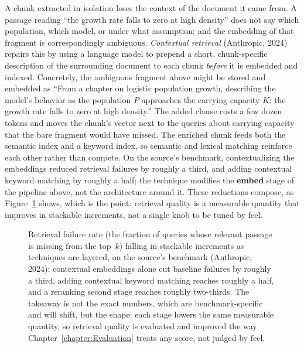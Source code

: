 A chunk extracted in isolation loses the context of the document it came from.
A passage reading ``the growth rate falls to zero at high density'' does not say which population, which model, or under what assumption; and the embedding of that fragment is correspondingly ambiguous.
\emph{Contextual retrieval} (Anthropic, 2024) repairs this by using a language model to prepend a short, chunk-specific description of the surrounding document to each chunk \emph{before} it is embedded and indexed.
Concretely, the ambiguous fragment above might be stored and embedded as ``From a chapter on logistic population growth, describing the model's behavior as the population $P$ approaches the carrying capacity $K$: the growth rate falls to zero at high density.''
The added clause costs a few dozen tokens and moves the chunk's vector next to the queries about carrying capacity that the bare fragment would have missed.
The enriched chunk feeds both the semantic index and a keyword index, so semantic and lexical matching reinforce each other rather than compete.
On the source's benchmark, contextualizing the embeddings reduced retrieval failures by roughly a third, and adding contextual keyword matching by roughly a half; the technique modifies the \textbf{embed} stage of the pipeline above, not the architecture around it.
These reductions compose, as Figure~\ref{figure:RetrievalStaircase} shows, which is the point: retrieval quality is a measurable quantity that improves in stackable increments, not a single knob to be tuned by feel.

\begin{figure}[htb!]
\begin{center}

\caption{Retrieval failure rate (the fraction of queries whose relevant passage is missing from the top~$k$) falling in stackable increments as techniques are layered, on the source's benchmark (Anthropic, 2024): contextual embeddings alone cut baseline failures by roughly a third, adding contextual keyword matching reaches roughly a half, and a reranking second stage reaches roughly two-thirds.
The takeaway is not the exact numbers, which are benchmark-specific and will shift, but the shape: each stage lowers the same measurable quantity, so retrieval quality is evaluated and improved the way Chapter~\ref{chapter:Evaluation} treats any score, not judged by feel.}
\label{figure:RetrievalStaircase}
\end{center}
\end{figure}


